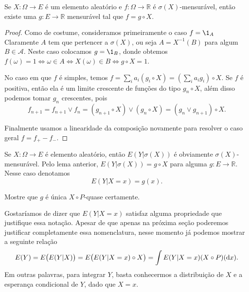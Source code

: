 \begin{lemma}
  \label{l:f_g_circ_X}
  Se $X: \Omega \to E$ é um elemento aleatório e $f:\Omega \to \mathbb{R}$ é $\sigma(X)$-mensurável, então existe uma $g:E \to \mathbb{R}$ mensurável tal que $f = g \circ X$.
\end{lemma}

\begin{proof}
  Como de costume, consideramos primeiramente o caso $f = \1_A$
  Claramente $A$ tem que pertencer a $\sigma(X)$, ou seja $A = X^{-1}(B)$ para algum $B \in \mathcal{A}$.
  Neste caso colocamos $g = \1_B$, donde obtemos $f(\omega) = 1 \Leftrightarrow \omega \in A \Leftrightarrow X(\omega) \in B \Leftrightarrow g \circ X = 1$.

  No caso em que $f$ é simples, temos $f = \sum_i a_i (g_i \circ X) = (\sum_i a_i g_i) \circ X$.
  Se $f$ é positiva, então ela é um limite crescente de funções do tipo $g_n \circ X$, além disso podemos tomar $g_n$ crescentes, pois
  \begin{equation}
    f_{n+1} = f_{n+1} \vee f_{n} = (g_{n+1} \circ X) \vee (g_n \circ X) = (g_n \vee g_{n+1}) \circ X.
  \end{equation}

  Finalmente usamos a linearidade da composição novamente para resolver o caso geral $f = f_+ - f_-$.
\end{proof}

Se $X: \Omega \to E$ é elemento aleatório, então $E(Y|\sigma(X))$ é obviamente $\sigma(X)$-mensurável.
Pelo lema anterior, $E(Y|\sigma(X)) = g \circ X$ para alguma $g: E \to \mathbb{R}$.
Nesse caso denotamos
\begin{equation}
  E(Y|X = x) = g(x).
\end{equation}

\begin{exercise}
  Mostre que $g$ é única $X \circ P$-quase certamente.
\end{exercise}

Gostaríamos de dizer que $E(Y|X = x)$ satisfaz alguma propriedade que justifique essa notação.
Apesar de que apenas na próxima seção poderemos justificar completamente essa nomenclatura, nesse momento já podemos mostrar a seguinte relação
\begin{equation*}
  E(Y) = E\big( E(Y | X) \big) = E\big( E(Y | X = x) \circ X \big) = \int E(Y| X = x) (X \circ P) (\mathop{}\!\mathrm{d} x).
\end{equation*}
Em outras palavras, para integrar $Y$, basta conhecermos a distribuição de $X$ e a esperança condicional de $Y$, dado que $X = x$.

